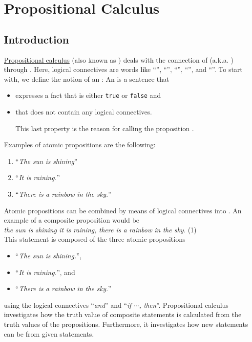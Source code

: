 \chapter{Propositional Calculus}
\section{Introduction}
\href{https://en.wikipedia.org/wiki/Propositional_calculus}{Propositional calculus}
(also known as ) deals with the connection of
(a.k.a. ) through 
.  Here, logical connectives are words like ``'', ``'',
``'', ``'', and ``''.  To
start with, we define the notion of an : An
 is a sentence  that 
\begin{itemize}
\item expresses a fact that is either \texttt{true} or \texttt{false} and
\item that does not contain any logical connectives.

      This last property is the reason for calling the proposition .
\end{itemize}
Examples of atomic propositions are the following:
\begin{enumerate}
\item ``\textsl{The sun is shining}''
\item ``\textsl{It is raining.}''
\item ``\textsl{There is a rainbow in the sky.}''
\end{enumerate}
Atomic propositions can be combined by means of logical connectives
into .  An example of a
composite proposition would be
\\[0.2cm] 
\hspace*{1.3cm}
\textsl{ the sun is shining  it is raining,  there is a rainbow in the sky.} 
\hspace*{\fill} (1)
\\[0.2cm]
This statement is composed of the three atomic propositions
\begin{itemize}
\item ``\textsl{The sun is shining.}'', 
\item ``\textsl{It is raining.}'', and
\item ``\textsl{There is a rainbow in the sky.}''
\end{itemize}
using the logical connectives ``\textsl{and}'' and ``\textsl{if $\cdots$, then}''.
Propositional calculus investigates how the truth value of composite statements is
calculated from the truth values of the propositions.  Furthermore, it investigates
how new statements can be  from given statements. 

